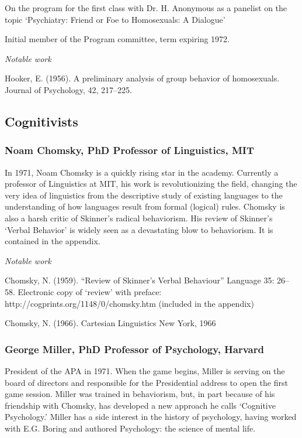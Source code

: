 On the program for the first class with Dr. H. Anonymous as a panelist on the topic `Psychiatry: Friend or Foe to Homosexuals: A Dialogue'

Initial member of the Program committee, term expiring 1972.

\emph{Notable work}

Hooker, E. (1956). A preliminary analysis of group behavior of homosexuals. Journal of Psychology, 42, 217--225.

\subsection{Cognitivists}
\label{cognitivists}

\subsubsection{Noam Chomsky, PhD Professor of Linguistics, MIT}
\label{noamchomskyphdprofessoroflinguisticsmit}

In 1971, Noam Chomsky is a quickly rising star in the academy. Currently a professor of Linguistics at MIT, his work is revolutionizing the field, changing the very idea of linguistics from the descriptive study of existing languages to the understanding of how languages result from formal (logical) rules. Chomsky is also a harsh critic of Skinner's radical behaviorism. His review of Skinner's `Verbal Behavior' is widely seen as a devastating blow to behaviorism. It is contained in the appendix.

\emph{Notable work}

Chomsky, N. (1959). ``Review of Skinner's Verbal Behaviour'' Language 35: 26--58. Electronic copy of `review' with preface: http:\slash \slash cogprints.org\slash 1148\slash 0\slash chomsky.htm (included in the appendix)

Chomsky, N. (1966). Cartesian Linguistics New York, 1966

\subsubsection{George Miller, PhD Professor of Psychology, Harvard}
\label{georgemillerphdprofessorofpsychologyharvard}

President of the APA in 1971. When the game begins, Miller is serving on the board of directors and responsible for the Presidential address to open the first game session. Miller was trained in behaviorism, but, in part because of his friendship with Chomsky, has developed a new approach he calls `Cognitive Psychology.' Miller has a side interest in the history of psychology, having worked with E.G. Boring and authored Psychology: the science of mental life.

